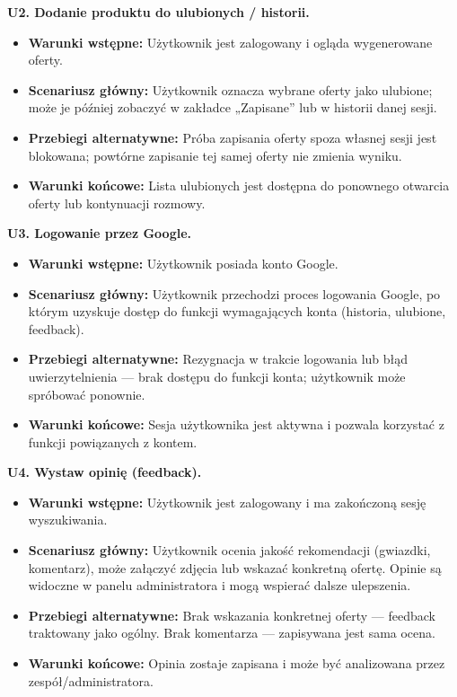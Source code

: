 \documentclass[12pt,a4paper]{article}
\begin{document}
\textbf{U2. Dodanie produktu do ulubionych / historii.}
\begin{itemize}
    \item \textbf{Warunki wstępne:} Użytkownik jest zalogowany i ogląda wygenerowane oferty.
    \item \textbf{Scenariusz główny:} Użytkownik oznacza wybrane oferty jako ulubione; może je później zobaczyć w zakładce „Zapisane” lub w historii danej sesji.
    \item \textbf{Przebiegi alternatywne:} Próba zapisania oferty spoza własnej sesji jest blokowana; powtórne zapisanie tej samej oferty nie zmienia wyniku.
    \item \textbf{Warunki końcowe:} Lista ulubionych jest dostępna do ponownego otwarcia oferty lub kontynuacji rozmowy.
\end{itemize}

\textbf{U3. Logowanie przez Google.}
\begin{itemize}
    \item \textbf{Warunki wstępne:} Użytkownik posiada konto Google.
    \item \textbf{Scenariusz główny:} Użytkownik przechodzi proces logowania Google, po którym uzyskuje dostęp do funkcji wymagających konta (historia, ulubione, feedback).
    \item \textbf{Przebiegi alternatywne:} Rezygnacja w trakcie logowania lub błąd uwierzytelnienia — brak dostępu do funkcji konta; użytkownik może spróbować ponownie.
    \item \textbf{Warunki końcowe:} Sesja użytkownika jest aktywna i pozwala korzystać z funkcji powiązanych z kontem.
\end{itemize}

\textbf{U4. Wystaw opinię (feedback).}
\begin{itemize}
    \item \textbf{Warunki wstępne:} Użytkownik jest zalogowany i ma zakończoną sesję wyszukiwania.
    \item \textbf{Scenariusz główny:} Użytkownik ocenia jakość rekomendacji (gwiazdki, komentarz), może załączyć zdjęcia lub wskazać konkretną ofertę. Opinie są widoczne w panelu administratora i mogą wspierać dalsze ulepszenia.
    \item \textbf{Przebiegi alternatywne:} Brak wskazania konkretnej oferty — feedback traktowany jako ogólny. Brak komentarza — zapisywana jest sama ocena.
    \item \textbf{Warunki końcowe:} Opinia zostaje zapisana i może być analizowana przez zespół/administratora.
\end{itemize}
\end{document}
